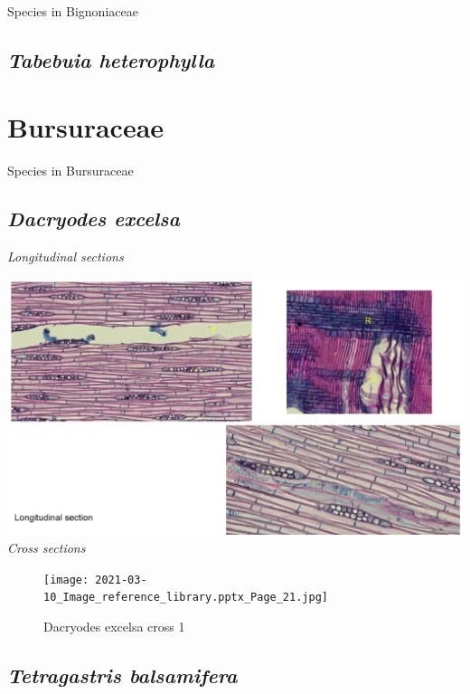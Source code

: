 \documentclass[
]{book}
\begin{document}
Species in Bignoniaceae

\hypertarget{tabebuia-heterophylla}{%
\section*{\texorpdfstring{\emph{Tabebuia heterophylla}}{Tabebuia heterophylla}}\label{tabebuia-heterophylla}}

\hypertarget{bursuraceae}{%
\chapter{Bursuraceae}\label{bursuraceae}}

Species in Bursuraceae

\hypertarget{dacryodes-excelsa}{%
\section*{\texorpdfstring{\emph{Dacryodes excelsa}}{Dacryodes excelsa}}\label{dacryodes-excelsa}}

\emph{Longitudinal sections}

\includegraphics{images/DACEXC/2021-03-10_Image_reference_library.pptx_Page_20.jpg}
\emph{Cross sections}

\begin{figure}
\centering
\texttt{[image: 2021-03-10\_Image\_reference\_library.pptx\_Page\_21.jpg]}
\caption{Dacryodes excelsa cross 1}
\end{figure}

\hypertarget{tetragastris-balsamifera}{%
\section*{\texorpdfstring{\emph{Tetragastris balsamifera}}{Tetragastris balsamifera}}\label{tetragastris-balsamifera}}
\end{document}
